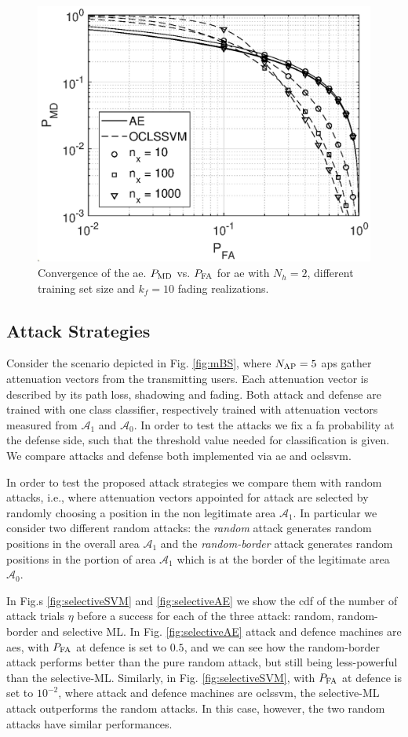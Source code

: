 \documentclass[draftcls,onecolumn,12pt]{IEEEtran}
\begin{document}
\begin{figure}[t]
    \centering
    \includegraphics[width=0.6\columnwidth]{res_avgnTrain_oneClass_kf10.eps}
    \caption{Convergence of the \ac{ae}. $P_{\rm MD}$ vs. $P_{\rm FA}$ for \ac{ae} with $N_h = 2$, different training set size and $k_f=10$ fading realizations.}
    \label{fig:kf10Oc}
\end{figure}

\subsection{Attack Strategies}
Consider the scenario depicted in Fig. \ref{fig:mBS}, where $N_{\rm AP}=5$ \acp{ap} gather attenuation vectors from the transmitting users. Each attenuation vector is described by its path loss, shadowing and fading.  Both attack and defense are trained with one class classifier, respectively trained with attenuation vectors measured from $\mathcal{A}_1$ and $\mathcal{A}_0$. In order to test the attacks we fix a \ac{fa} probability at the defense side, such that the threshold value needed for classification is given. We compare attacks and defense both implemented via \ac{ae} and \ac{oclssvm}. 

In order to test the proposed attack strategies we compare them with random attacks, i.e., where attenuation vectors appointed for attack are selected by randomly choosing a position in the non legitimate area $\mathcal{A}_1$. In particular we consider two different random attacks: the \emph{random} attack generates random positions in the overall area $\mathcal{A}_1$ and the \emph{random-border} attack generates random positions in the portion of area $\mathcal{A}_1$ which is at the border of the legitimate area $\mathcal{A}_0$. 

In Fig.s \ref{fig:selectiveSVM} and \ref{fig:selectiveAE} we show the \ac{cdf} of the number of attack trials $\eta$ before a success for each of the three attack: random, random-border and selective ML.
In Fig. \ref{fig:selectiveAE} attack and defence machines are \acp{ae}, with $P_{\rm FA}$ at defence is set to $0.5$, and we can see how the random-border attack performs better than the pure random attack, but still being less-powerful than the selective-ML. Similarly, in Fig. \ref{fig:selectiveSVM}, with $P_{\rm FA}$ at defence is set to $10^{-2}$, where attack and defence machines are \ac{oclssvm}, the selective-ML attack outperforms the random attacks. In this case, however, the two random attacks have similar performances.
\end{document}
